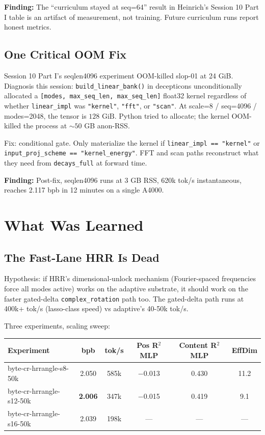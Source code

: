 \documentclass[11pt,a4paper]{report}
\newcommand{\finding}[1]{\textcolor{finding}{\textbf{Finding:}} #1}
\begin{document}
\finding{The ``curriculum stayed at seq=64'' result in Heinrich's Session 10 Part I table is an artifact of measurement, not training. Future curriculum runs report honest metrics.}


\chapter{One Critical OOM Fix}

Session 10 Part I's seqlen4096 experiment OOM-killed slop-01 at 24 GiB. Diagnosis this session: \texttt{build\_linear\_bank()} in decepticons unconditionally allocated a \texttt{[modes, max\_seq\_len, max\_seq\_len]} float32 kernel regardless of whether \texttt{linear\_impl} was \texttt{"kernel"}, \texttt{"fft"}, or \texttt{"scan"}. At scale=8 / seq=4096 / modes=2048, the tensor is $128 \text{ GiB}$. Python tried to allocate; the kernel OOM-killed the process at $\sim 50$ GB anon-RSS.

Fix: conditional gate. Only materialize the kernel if \texttt{linear\_impl == "kernel"} or \texttt{input\_proj\_scheme == "kernel\_energy"}. FFT and scan paths reconstruct what they need from \texttt{decays\_full} at forward time.

\finding{Post-fix, seqlen4096 runs at 3 GB RSS, 620k tok/s instantaneous, reaches 2.117 bpb in 12 minutes on a single A4000.}


\part{What Was Learned}

\chapter{The Fast-Lane HRR Is Dead}

Hypothesis: if HRR's dimensional-unlock mechanism (Fourier-spaced frequencies force all modes active) works on the adaptive substrate, it should work on the faster gated-delta \texttt{complex\_rotation} path too. The gated-delta path runs at 400k+ tok/s (lasso-class speed) vs adaptive's 40-50k tok/s.

Three experiments, scaling sweep:

\begin{center}
\begin{tabular}{lccccc}
\toprule
Experiment & bpb & tok/s & Pos R$^2$ MLP & Content R$^2$ MLP & EffDim \\
\midrule
byte-cr-hrrangle-s8-50k & 2.050 & 585k & $-$0.013 & 0.430 & 11.2 \\
byte-cr-hrrangle-s12-50k & \textbf{2.006} & 347k & $-$0.015 & 0.419 & 9.1 \\
byte-cr-hrrangle-s16-50k & 2.039 & 198k & --- & --- & --- \\
\bottomrule
\end{tabular}
\end{center}
\end{document}
